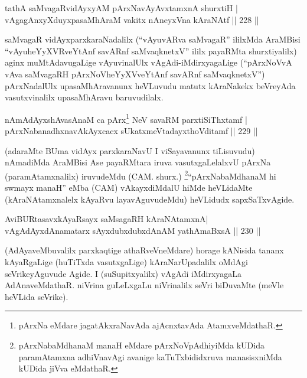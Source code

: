 
\begin{shl}
tathA saMvagaRvidAyxyAM pArxNavAyAvxtamxnA shurxtiH |\\
vAgagAnxyXduyxpasaMhAraM vakitx nAneyxVna kAraNAtf \hfill || 228 ||
\end{shl}

\begin{artha}
saMvagaR vidAyxparxkaraNadalilx (``vAyuvARva saMvagaR'' ililxMda AraMBisi ``vAyuheYyXVRveYtAnf savARnf saMvaqknetxV'' ililx payaRMta shurxtiyalilx) aginx muMtAdavugaLige vAyuvinalUlx vAgAdi-iMdirxyagaLige (``pArxNoVvA vAva saMvagaRH pArxNoVheYyXVveYtAnf savARnf saMvaqknetxV'') pArxNadalUlx upasaMhAravanunx heVLuvudu matutx kAraNakekx beVreyAda vasutxvinalilx upasaMhAravu baruvudilalx.
\end{artha}


\begin{shl}
nAmAdAyxshAvasAnaM ca pArx\footnote{pArxNa eMdare jagatAkxraNavAda ajAcnxtavAda AtamxveMdathaR.} NeV savaRM parxtiSiThxtamf |\\
pArxNabanadhxnavAkAyxcacx sUkatxmeVtadayxthoVditamf \hfill || 229 ||
\end{shl}

\begin{artha}
(adaraMte BUma vidAyx parxkaraNavU I viSayavanunx tiLisuvudu) nAmadiMda AraMBisi Ase payaRMtara iruva vasutxgaLelalxvU pArxNa (paramAtamxnalilx) iruvudeMdu (CAM. shurx.) \footnote{pArxNabaMdhanaM manaH eMdare pArxNoVpAdhiyiMda kUDida paramAtamxna adhiVnavAgi avanige kaTuTxbididxruva manasisxniMda kUDida jiVva eMdathaR.}``pArxNabaMdhanaM hi swmayx manaH'' eMba (CAM) vAkayxdiMdalU hiMde heVLidaMte (kAraNAtamxnalelx kAyaRvu layavAguvudeMdu) heVLidudx sapxSaTxvAgide.
\end{artha}

\begin{shl}
AviBURtasavxkAyaRsayx saMsagaRH kAraNAtamxnA|\\
vAgAdAyxdAnamatarx sAyxdubxdubxdAnAM yathA\s maBxsA \hfill || 230 ||
\end{shl}

\begin{artha}
(AdAyaveMbuvalilx parxkaqtige athaRveVneMdare) horage kANisida tananx kAyaRgaLige (huTiTxda vasutxgaLige) kAraNarUpadalilx oMdAgi seVrikeyAguvude Agide. I (suSupitxyalilx) vAgAdi iMdirxyagaLa AdAnaveMdathaR. niVrina guLeLxgaLu niVrinalilx seVri biDuvaMte (meVle heVLida seVrike).
\end{artha}

